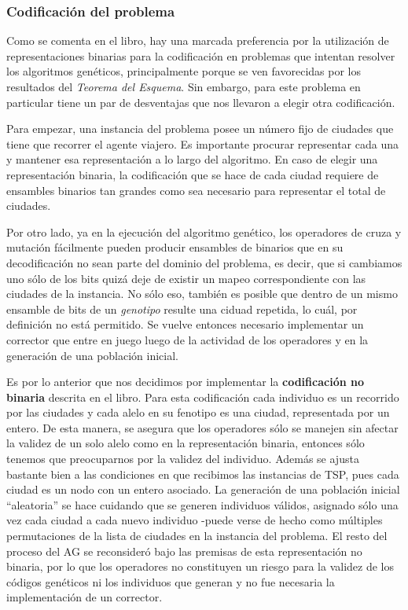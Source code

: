 \documentclass[12pt]{article}
\begin{document}
\subsubsection*{Codificación del problema}
Como se comenta en el libro, hay una marcada preferencia por la utilización de
representaciones binarias para la codificación en problemas que intentan
resolver los algoritmos genéticos, principalmente porque se ven favorecidas
por los resultados del \textit{Teorema del Esquema}. Sin embargo, para este
problema en particular tiene un par de desventajas que nos llevaron a elegir
otra codificación.\par
Para empezar, una instancia del problema posee un número fijo
de ciudades que tiene que recorrer el agente viajero. Es importante procurar
representar cada una y mantener esa representación a lo
largo del algoritmo. En caso de elegir una representación binaria,
la codificación que se hace de cada ciudad requiere de ensambles binarios tan
grandes como sea necesario para representar el total de ciudades.\par
Por otro lado, ya en la ejecución del algoritmo genético, los operadores de
cruza y mutación fácilmente pueden producir ensambles de binarios que en
su decodificación no sean parte del dominio del problema, es decir, que si
cambiamos uno sólo de los bits quizá deje de existir un mapeo correspondiente con las
ciudades de la instancia. No sólo eso, también es posible que dentro de un mismo
ensamble de bits de un \textit{genotipo} resulte una ciduad repetida, lo cuál,
por definición no está permitido. Se vuelve entonces necesario implementar un
corrector que entre en juego luego de la actividad de los operadores y en la
generación de una población inicial.\par
Es por lo anterior que nos decidimos por implementar la \textbf{codificación no binaria} descrita
en el libro. Para esta codificación cada individuo es un recorrido por las ciudades
y cada alelo en su fenotipo es una ciudad, representada por un entero. De esta
manera, se asegura que los operadores sólo se manejen sin afectar la validez
de un solo alelo como en la representación binaria, entonces sólo tenemos que
preocuparnos por la validez del individuo.
Además se ajusta bastante bien a las condiciones en que recibimos las instancias de TSP,
pues cada ciudad es un nodo con un entero asociado.
La generación de una población inicial ``aleatoria'' se hace cuidando que se
generen individuos válidos, asignado sólo una vez cada ciudad a cada nuevo individuo
-puede verse de hecho como múltiples permutaciones de la lista de
ciudades en la instancia del problema.
El resto del proceso del AG se reconsideró bajo las premisas de esta representación
no binaria, por lo que los operadores no constituyen un riesgo para la validez
de los códigos genéticos ni los individuos que generan y no fue necesaria la
implementación de un corrector.
\end{document}
